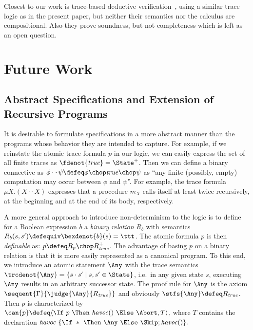 \documentclass[a4paper,numberwithinsect]{lipics-v2021}
\begin{document}
Closest to our work is trace-based deductive
verification~\cite{bub-et-al-23}, using a similar trace logic as in
the present paper, but neither their semantics nor the calculus are
compositional. Also they prove soundness, but not completeness which
is left as an open question.


\section{Future Work}
\label{sec:future-work}

\subsection{Abstract Specifications and Extension of Recursive
  Programs}
\label{sec:abstr-spec}

It is desirable to formulate specifications in a more abstract manner
than the programs whose behavior they are intended to capture.  For
example, if we reinstate the atomic trace formula $p$ in our logic, we
can easily express the set of all finite traces as
$\fdenot{\mathit{true}}=\State^+$. Then we can define a binary
connective as
$\phi\cdot\cdot\,\psi\defeq\phi\chop\mathit{true}\chop\psi$ as ``any
finite (possibly, empty) computation may occur between $\phi$ and
$\psi$''. For example, the trace formula $\mu X.(X \cdot\cdot\, X)$
expresses that a procedure $m_X$ calls itself at least twice
recursively, at the beginning and at the end of its body,
respectively.

A more general approach to introduce non-determinism to the logic is
to define for a Boolean expression $b$ a \emph{binary relation} $R_b$
with semantics $R_b(s,s')\defequiv\bexdenot{b}(s)=\ttt$. The atomic
formula $p$ is then \emph{definable} as:
$p\defeq R_p\chop R_\mathit{true}^+$.
%
The advantage of basing $p$ on a binary relation is that it is more
easily represented as a canonical program. To this end, we introduce
an atomic statement $\Any$ with the trace semantics
$\trcdenot{\Any}=\{s\cdot s'\mid s,s'\in\State\}$, i.e.~in any given
state $s$, executing $\Any$ results in an arbitrary successor state.
The proof rule for $\Any$ is the axiom
$\sequent{\Gamma}{\judge{\Any}{R_\mathit{true}}}$ and obviously
$\stfs{\Any}\defeq R_{\mathit{true}}$.  Then $p$ is characterized by
$\can{p}\defeq\langle\If\ p\ \Then\ \mathit{havoc()}\ \Else\
\Abort,T\rangle$, where $T$ contains the declaration
%
$
\mathit{havoc}\ \{\If\ \ast\ \Then\ \Any\ \Else\ \Skip;\mathit{havoc()}\}.
$
  
\end{document}
